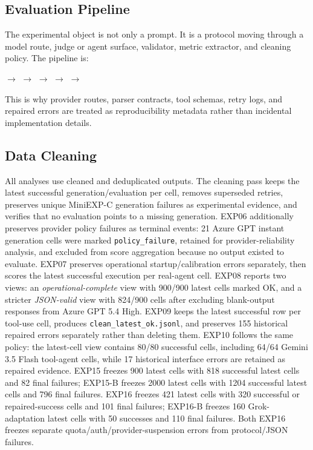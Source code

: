 \documentclass[11pt]{article}
\begin{document}
\subsection{Evaluation Pipeline}
The experimental object is not only a prompt. It is a protocol moving through a model route, judge or agent surface, validator, metric extractor, and cleaning policy. The pipeline is:

\begin{center}
\small
{} $\rightarrow$
 $\rightarrow$
 $\rightarrow$
 $\rightarrow$
 $\rightarrow$
\end{center}

This is why provider routes, parser contracts, tool schemas, retry logs, and repaired errors are treated as reproducibility metadata rather than incidental implementation details.

\subsection{Data Cleaning}
All analyses use cleaned and deduplicated outputs. The cleaning pass keeps the latest successful generation/evaluation per cell, removes superseded retries, preserves unique MiniEXP-C generation failures as experimental evidence, and verifies that no evaluation points to a missing generation. EXP06 additionally preserves provider policy failures as terminal events: 21 Azure GPT instant generation cells were marked \texttt{policy\_failure}, retained for provider-reliability analysis, and excluded from score aggregation because no output existed to evaluate. EXP07 preserves operational startup/calibration errors separately, then scores the latest successful execution per real-agent cell. EXP08 reports two views: an \emph{operational-complete} view with 900/900 latest cells marked OK, and a stricter \emph{JSON-valid} view with 824/900 cells after excluding blank-output responses from Azure GPT 5.4 High. EXP09 keeps the latest successful row per tool-use cell, produces \texttt{clean\_latest\_ok.jsonl}, and preserves 155 historical repaired errors separately rather than deleting them. EXP10 follows the same policy: the latest-cell view contains 80/80 successful cells, including 64/64 Gemini 3.5 Flash tool-agent cells, while 17 historical interface errors are retained as repaired evidence. EXP15 freezes 900 latest cells with 818 successful latest cells and 82 final failures; EXP15-B freezes 2000 latest cells with 1204 successful latest cells and 796 final failures. EXP16 freezes 421 latest cells with 320 successful or repaired-success cells and 101 final failures; EXP16-B freezes 160 Grok-adaptation latest cells with 50 successes and 110 final failures. Both EXP16 freezes separate quota/auth/provider-suspension errors from protocol/JSON failures.
\end{document}

